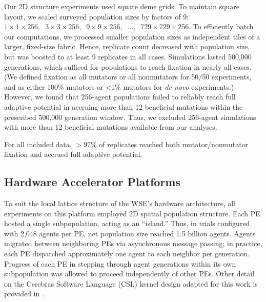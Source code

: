 Our 2D structure experiments used square deme grids.
To maintain square layout, we scaled surveyed population sizes by factors of 9: $1 \times 1 \times 256,\;\; 3 \times 3 \times 256,\;\; 9 \times 9 \times 256,\;\; \ldots,\;\; 729 \times 729 \times 256$.
To efficiently batch our computations, we processed smaller population sizes as independent tiles of a larger, fixed-size fabric.
Hence, replicate count decreased with population size, but was boosted to at least 9 replicates in all cases.
Simulations lasted 500,000 generations, which sufficed for populations to reach fixation in nearly all cases.
(We defined fixation as all mutators or all nonmutators for 50/50 experiments, and as either 100\% mutators or <1\% mutators for \textit{de novo} experiments.)
However, we found that 256-agent populations failed to reliably reach full adaptive potential in accruing more than 12 beneficial mutations within the prescribed 500,000 generation window.
Thus, we excluded 256-agent simulations with more than 12 beneficial mutations available from our analyses.

For all included data, $>97\%$ of replicates reached both mutator/nonmutator fixation and accrued full adaptive potential.

\subsection{Hardware Accelerator Platforms} \label{sec:hardware}


To suit the local lattice structure of the WSE's hardware architecture, all experiments on this platform employed 2D spatial population structure.
Each PE hosted a single subpopulation, acting as an ``island.''
Thus, in trials configured with 2,048 agents per PE, net population size reached 1.5 billion agents.
Agents migrated between neighboring PEs via asynchronous message passing;
in practice, each PE dispatched approximately one agent to each neighbor per generation.
Progress of each PE in stepping through agent generations within its own subpopulation was allowed to proceed independently of other PEs.
Other detail on the Cerebras Software Language (CSL) kernel design adapted for this work is provided in \cite{moreno2024trackable}.

